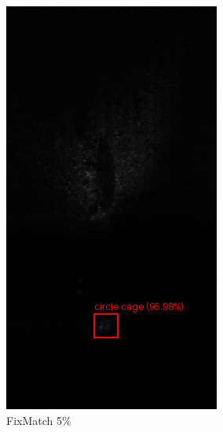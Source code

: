 \documentclass[a0,portrait]{hogent-poster}
\begin{document}
\begin{multicols}{2}
\begin{figure}[H]
\begin{subfigure}{.2\linewidth}
        \includegraphics[width=0.9\linewidth]{1_fixmatch_5pct.png}
        \caption{FixMatch 5\%}
    \end{subfigure}%
    \hfill
    \begin{subfigure}{.2\linewidth}
        \centering
        \captionsetup{justification=centering}

\end{subfigure}
\end{figure}
\end{multicols}
\end{document}
